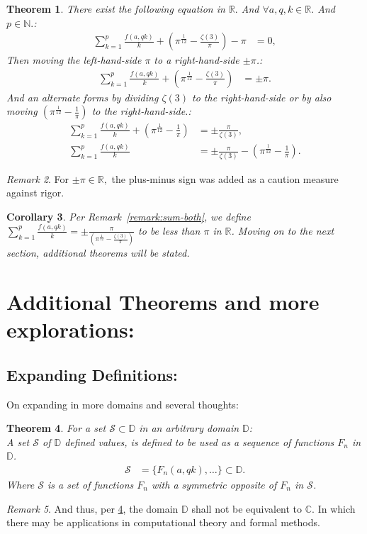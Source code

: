 \documentclass[10pt]{article}
\theoremstyle{plain}
\newtheorem{theorem}{Theorem}[section]
\newtheorem{corollary}[theorem]{Corollary}
\theoremstyle{definition}
\theoremstyle{remark}
\newtheorem{remark}[theorem]{Remark}
\begin{document}
\begin{theorem}
There exist the following equation in $\mathbb{R}.$ And $\forall a, q, k \in \mathbb{R}.$ And $p \in \mathbb{N}.$:
\begin{align*}
	\sum_{k=1}^{p} \frac{f(a, qk)}{k} + (\pi^{\frac{1}{12}} - \frac{\zeta(3)}{\pi}) - \pi &= 0,
\end{align*}
Then moving the left-hand-side $\pi$ to a right-hand-side $\pm \pi$.:
\begin{align*}
	\sum_{k=1}^{p} \frac{f(a, qk)}{k} + (\pi^{\frac{1}{12}} - \frac{\zeta(3)}{\pi}) &= \pm \pi.
\end{align*}
And an alternate forms by dividing $\zeta(3)$ to the right-hand-side or by also moving $(\pi^{\frac{1}{12}} - \frac{1}{\pi})$ to the right-hand-side.:
\begin{align*}
	\sum_{k=1}^{p} \frac{f(a, qk)}{k} + (\pi^{\frac{1}{12}} - \frac{1}{\pi}) &= \pm \frac{\pi}{\zeta(3)},\\
	\sum_{k=1}^{p} \frac{f(a, qk)}{k} &= \pm \frac{\pi}{\zeta(3)} - (\pi^{\frac{1}{12}} - \frac{1}{\pi}) .
\end{align*}
\end{theorem}
\begin{remark}
For $\pm \pi \in \mathbb{R},$ the plus-minus sign was added as a caution measure against rigor.
\end{remark}
\begin{corollary}
Per Remark~\ref{remark:sum-both}, we define $\sum_{k=1}^{p} \frac{f(a, qk)}{k} = \pm \frac{\pi}{(\pi^{\frac{1}{12}} - \frac{\zeta(3)}{\pi})}$ to be less than $\pi$ in $\mathbb{R}$.  Moving on to the next section, additional theorems will be stated.
\end{corollary}
\section{Additional Theorems and more explorations:}

\subsection{Expanding Definitions:}
On expanding in more domains and several thoughts:

\begin{theorem}
\label{theo-1}
	For a set $\mathcal{S} \subset \mathbb{D}$ in an arbitrary domain $\mathbb{D}$:\\
	A set $\mathcal{S}$ of $\mathbb{D}$ defined values, is defined to be used as a sequence of functions $F_n$ in $\mathbb{D}$.
	\begin{align*}
		\mathcal{S} &= \{F_n(a, qk), \dots\} \subset \mathbb{D}.
	\end{align*}
	Where $\mathcal{S}$ is a set of functions $F_n$ with a symmetric opposite of $F_n$ in $\mathcal{S}$.
\end{theorem}
\begin{remark}
	And thus, per \ref{theo-1}, the domain $\mathbb{D}$ shall not be equivalent to $\mathbb{C}$. In which there may be applications in computational theory and formal methods.
\end{remark}
\end{document}
